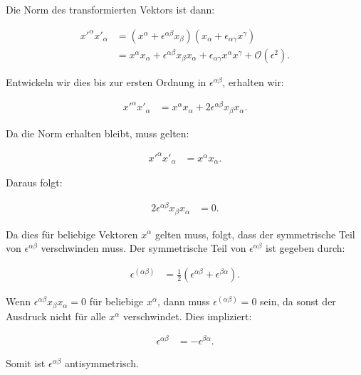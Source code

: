 \documentclass[11pt,a4paper]{article}
\begin{document}
Die Norm des transformierten Vektors ist dann:

\begin{align*}
x'^\alpha x'_\alpha &= (x^\alpha + \epsilon^{\alpha \beta} x_\beta)(x_\alpha + \epsilon_{\alpha \gamma} x^\gamma) \\
&= x^\alpha x_\alpha + \epsilon^{\alpha \beta} x_\beta x_\alpha + \epsilon_{\alpha \gamma} x^\alpha x^\gamma + \mathcal{O}(\epsilon^2).
\end{align*}

Entwickeln wir dies bis zur ersten Ordnung in $\epsilon^{\alpha \beta}$, erhalten wir:

\begin{align*}
x'^\alpha x'_\alpha &= x^\alpha x_\alpha + 2 \epsilon^{\alpha \beta} x_\beta x_\alpha.
\end{align*}

Da die Norm erhalten bleibt, muss gelten:

\begin{align*}
x'^\alpha x'_\alpha &= x^\alpha x_\alpha.
\end{align*}

Daraus folgt:

\begin{align*}
2 \epsilon^{\alpha \beta} x_\beta x_\alpha &= 0.
\end{align*}

Da dies für beliebige Vektoren $x^\alpha$ gelten muss, folgt, dass der symmetrische Teil von $\epsilon^{\alpha \beta}$ verschwinden muss. Der symmetrische Teil von $\epsilon^{\alpha \beta}$ ist gegeben durch:

\begin{align*}
\epsilon^{(\alpha \beta)} &= \frac{1}{2} (\epsilon^{\alpha \beta} + \epsilon^{\beta \alpha}).
\end{align*}

Wenn $\epsilon^{\alpha \beta} x_\beta x_\alpha = 0$ für beliebige $x^\alpha$, dann muss $\epsilon^{(\alpha \beta)} = 0$ sein, da sonst der Ausdruck nicht für alle $x^\alpha$ verschwindet. Dies impliziert:

\begin{align*}
\epsilon^{\alpha \beta} &= -\epsilon^{\beta \alpha}.
\end{align*}

Somit ist $\epsilon^{\alpha \beta}$ antisymmetrisch.

\end{document}
